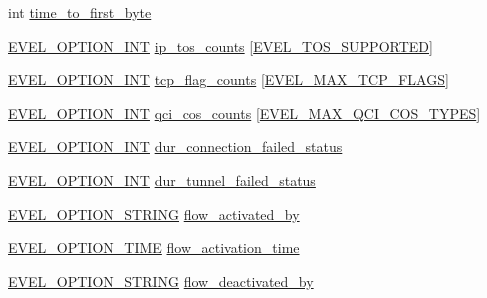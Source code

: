 \begin{DoxyCompactItemize}
int \hyperlink{structmobile__gtp__per__flow__metrics_aac074434132cd43e1e717ad9f4dc7126}{time\+\_\+to\+\_\+first\+\_\+byte}
\item 
\hyperlink{evel_8h_a452d825778d1c2368a54b8f689a25ba7}{E\+V\+E\+L\+\_\+\+O\+P\+T\+I\+O\+N\+\_\+\+I\+NT} \hyperlink{structmobile__gtp__per__flow__metrics_aa36e26fcf56114f6113100b8b8e27cd2}{ip\+\_\+tos\+\_\+counts} \mbox{[}\hyperlink{evel_8h_a885e47485d9e2ab74f567c8b7b3e8043}{E\+V\+E\+L\+\_\+\+T\+O\+S\+\_\+\+S\+U\+P\+P\+O\+R\+T\+ED}\mbox{]}
\item 
\hyperlink{evel_8h_a452d825778d1c2368a54b8f689a25ba7}{E\+V\+E\+L\+\_\+\+O\+P\+T\+I\+O\+N\+\_\+\+I\+NT} \hyperlink{structmobile__gtp__per__flow__metrics_ab05402d6fdb636e226db3377ef3bea2c}{tcp\+\_\+flag\+\_\+counts} \mbox{[}\hyperlink{evel_8h_aeabdcbed22ac53495bea50059b06c993a9905d0291a16b01765e97eb3abb7afb2}{E\+V\+E\+L\+\_\+\+M\+A\+X\+\_\+\+T\+C\+P\+\_\+\+F\+L\+A\+GS}\mbox{]}
\item 
\hyperlink{evel_8h_a452d825778d1c2368a54b8f689a25ba7}{E\+V\+E\+L\+\_\+\+O\+P\+T\+I\+O\+N\+\_\+\+I\+NT} \hyperlink{structmobile__gtp__per__flow__metrics_a412543ab63678a1c7509753ff4f9eb2c}{qci\+\_\+cos\+\_\+counts} \mbox{[}\hyperlink{evel_8h_a2018881529f1dfb73c8b2689f5193c86a6715c1121b0a9793b2e8f5e03df35994}{E\+V\+E\+L\+\_\+\+M\+A\+X\+\_\+\+Q\+C\+I\+\_\+\+C\+O\+S\+\_\+\+T\+Y\+P\+ES}\mbox{]}
\item 
\hyperlink{evel_8h_a452d825778d1c2368a54b8f689a25ba7}{E\+V\+E\+L\+\_\+\+O\+P\+T\+I\+O\+N\+\_\+\+I\+NT} \hyperlink{structmobile__gtp__per__flow__metrics_a7577444f184095bb1c891669964093cf}{dur\+\_\+connection\+\_\+failed\+\_\+status}
\item 
\hyperlink{evel_8h_a452d825778d1c2368a54b8f689a25ba7}{E\+V\+E\+L\+\_\+\+O\+P\+T\+I\+O\+N\+\_\+\+I\+NT} \hyperlink{structmobile__gtp__per__flow__metrics_a85486887d7f53b58fad2b0cf1b13cf98}{dur\+\_\+tunnel\+\_\+failed\+\_\+status}
\item 
\hyperlink{evel_8h_a0de5113a7b72de93c0c7b644f7ea7ec3}{E\+V\+E\+L\+\_\+\+O\+P\+T\+I\+O\+N\+\_\+\+S\+T\+R\+I\+NG} \hyperlink{structmobile__gtp__per__flow__metrics_a6035766979a87bc92acf93fd04cf8efb}{flow\+\_\+activated\+\_\+by}
\item 
\hyperlink{evel_8h_ae0ea81cde70a2a1b685aae7ae8e9d19b}{E\+V\+E\+L\+\_\+\+O\+P\+T\+I\+O\+N\+\_\+\+T\+I\+ME} \hyperlink{structmobile__gtp__per__flow__metrics_af54aacdd72dcd6b5d5b33745eadd3e06}{flow\+\_\+activation\+\_\+time}
\item 
\hyperlink{evel_8h_a0de5113a7b72de93c0c7b644f7ea7ec3}{E\+V\+E\+L\+\_\+\+O\+P\+T\+I\+O\+N\+\_\+\+S\+T\+R\+I\+NG} \hyperlink{structmobile__gtp__per__flow__metrics_ac1bd98d1620e7640bc8c0d51ea7ef869}{flow\+\_\+deactivated\+\_\+by}

\end{DoxyCompactItemize}
